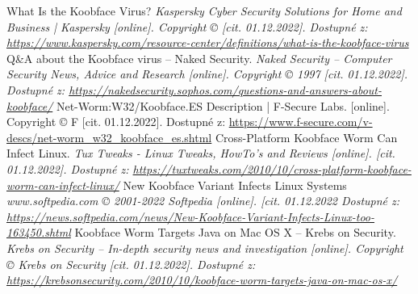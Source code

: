 \documentclass[a4paper,12pt]{article}
\begin{document}
{	
	{
		What Is the Koobface Virus?
		\it{Kaspersky Cyber Security Solutions for Home and Business | Kaspersky}
		[online]. Copyright © [cit. 01.12.2022].
		Dostupné z: \url{https://www.kaspersky.com/resource-center/definitions/what-is-the-koobface-virus}
	}
	{
		Q\&A about the Koobface virus – Naked Security.
		\it{Naked Security – Computer Security News, Advice and Research}
		[online]. Copyright © 1997 [cit. 01.12.2022].
		Dostupné z: \url{https://nakedsecurity.sophos.com/questions-and-answers-about-koobface/}
	}
	{
		Net-Worm:W32/Koobface.ES Description | F-Secure Labs.
		[online]. Copyright © F [cit. 01.12.2022].
		Dostupné z: \url{https://www.f-secure.com/v-descs/net-worm_w32_koobface_es.shtml}
	}
	{
		Cross-Platform Koobface Worm Can Infect Linux.
		\it{Tux Tweaks - Linux Tweaks, HowTo's and Reviews}
		[online]. [cit. 01.12.2022].
		Dostupné z: \url{https://tuxtweaks.com/2010/10/cross-platform-koobface-worm-can-infect-linux/}
	}
	{
		New Koobface Variant Infects Linux Systems
		\it{www.softpedia.com} © 2001-2022 Softpedia
		[online]. [cit. 01.12.2022
		Dostupné z: \url{https://news.softpedia.com/news/New-Koobface-Variant-Infects-Linux-too-163450.shtml}
	}
	{
		Koobface Worm Targets Java on Mac OS X – Krebs on Security.
		\it{Krebs on Security – In-depth security news and investigation}
		[online]. Copyright © Krebs on Security [cit. 01.12.2022].
		Dostupné z: \url{https://krebsonsecurity.com/2010/10/koobface-worm-targets-java-on-mac-os-x/}
	}
}











\end{document}

